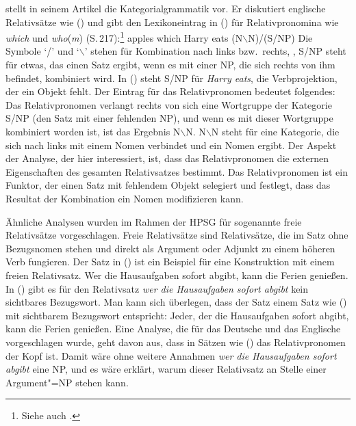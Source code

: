 \citet{Steedman89a} stellt in seinem Artikel die Kategorialgrammatik vor.
Er diskutiert englische Relativsätze wie () und gibt den
Lexikoneintrag in () für Relativpronomina wie \emph{which} und \emph{who}(\emph{m})
(S.\,217):\footnote{
  Siehe auch .
}
\ea
apples which Harry eats
\z
\ea
(N$\backslash$N)/(S/NP)
\z
Die Symbole `/' und `$\backslash$' stehen für Kombination nach links bzw.\
rechts, \dash, S/NP steht für etwas, das einen Satz ergibt, wenn es mit einer NP,
die sich rechts von ihm befindet, kombiniert wird. In (\mex{0}) steht
S/NP für \emph{Harry eats}, \dash die Verbprojektion, der ein Objekt fehlt.
Der Eintrag für das Relativpronomen bedeutet folgendes: Das Relativpronomen
verlangt rechts von sich eine Wortgruppe der Kategorie S/NP (den Satz mit einer
fehlenden NP), und wenn es mit dieser Wortgruppe kombiniert worden ist, ist das
Ergebnis N$\backslash$N. N$\backslash$N steht für eine Kategorie, die sich
nach links mit einem Nomen verbindet und ein Nomen ergibt. 
Der Aspekt der Analyse, der hier interessiert, ist, dass das Relativpronomen
die externen Eigenschaften des gesamten Relativsatzes bestimmt. Das Relativpronomen
ist ein Funktor, der einen Satz mit fehlendem Objekt selegiert und festlegt,
dass das Resultat der Kombination ein Nomen modifizieren kann.

Ähnliche Analysen wurden im Rahmen der HPSG für sogenannte freie Relativsätze
vorgeschlagen. Freie Relativsätze sind Relativsätze, die im Satz ohne Bezugsnomen
stehen und direkt als Argument oder Adjunkt zu einem höheren Verb fungieren.
Der Satz in (\mex{1}) ist ein Beispiel für eine Konstruktion mit einem freien Relativsatz.
\ea
Wer die Hausaufgaben sofort abgibt, kann die Ferien genießen.
\z
In () gibt es für den Relativsatz \emph{wer die Hausaufgaben sofort abgibt} kein
sichtbares Bezugswort. Man kann sich überlegen, dass der Satz einem Satz wie (\mex{1})
mit sichtbarem Bezugswort entspricht:
\ea
Jeder, der die Hausaufgaben sofort abgibt, kann die Ferien genießen.
\z
Eine Analyse, die für das Deutsche \citep{Kubota2002a} und das Englische \citep{WK03a}
vorgeschlagen wurde, geht davon aus, dass in Sätzen wie () das Relativpronomen der Kopf ist.
Damit wäre ohne weitere Annahmen \emph{wer die Hausaufgaben sofort abgibt} eine NP,
und es wäre erklärt, warum dieser Relativsatz an Stelle einer Argument"=NP stehen kann.

